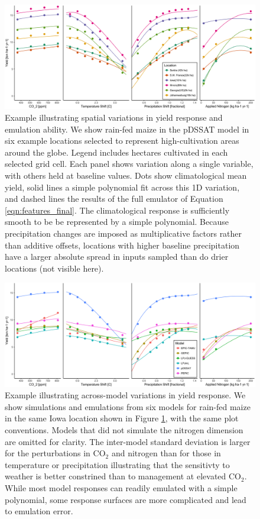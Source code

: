 \documentclass[preprint, 5p, times, twocolumn]{elsarticle}
\begin{document}
\begin{figure}[!h]
\centering
    \includegraphics[width=0.95\linewidth]{regression_areas.png}
    \caption{Example illustrating spatial variations in yield response and emulation ability. We show rain-fed maize in the pDSSAT model in six example locations selected to represent high-cultivation areas around the globe. Legend includes hectares cultivated in each selected grid cell. Each panel shows variation along a single variable, with others held at baseline values. Dots show climatological mean yield, solid lines a simple polynomial fit across this 1D variation, and dashed lines the results of the full emulator of Equation \ref{eqn:features_final}. The climatological response is sufficiently smooth to be be represented by a simple polynomial. Because precipitation changes are imposed as multiplicative factors rather than additive offsets, locations with higher baseline precipitation have a larger absolute spread in inputs sampled than do drier locations (not visible here).}
   \label{fig:regression}
\end{figure}

\begin{figure}[!h]
\centering
    \includegraphics[width=0.95\linewidth]{regression_model.png}
    \caption{Example illustrating across-model variations in yield response. We show simulations and emulations from six models for rain-fed maize in the same Iowa location shown in Figure \ref{fig:regression}, with the same plot conventions. Models that did not simulate the nitrogen dimension are omitted for clarity. The inter-model standard deviation is larger for the perturbations in CO$_2$ and nitrogen than for those in temperature or precipitation illustrating that the sensitivty to weather is better constrined than to management at elevated CO$_2$. While most model responses can readily emulated with a simple polynomial, some response surfaces are more complicated and lead to emulation error.}
   \label{fig:regression_iowa}
\end{figure}
\end{document}
